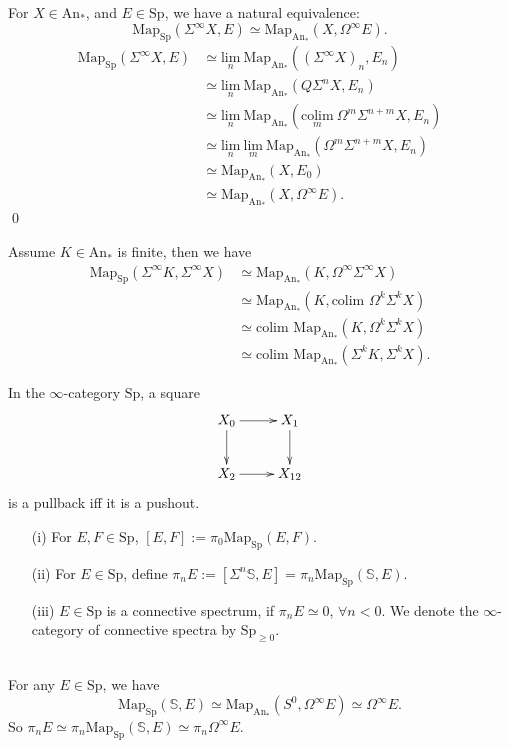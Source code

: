 \documentclass[UTF8,12,a4paper]{ctexart}
\theoremstyle{definition}
\newcommand{\An}{\text{An}}
\newcommand{\Sp}{\text{Sp}}
\begin{document}
~\\
\prop
For $X\in \An_*$, and $E\in \Sp$, we have a natural equivalence:
$$
\text{Map}_\Sp(\Sigma^\infty X, E)\simeq 
\text{Map}_{\An_*}(X,\Omega^\infty E). 
$$
\pf 
\begin{align*}
\text{Map}_\Sp(\Sigma^\infty X, E)
&\simeq  \underset{n}{\text{lim}}\ 
\text{Map}_{\An_*}((\Sigma^\infty X)_n,E_n)\\
&\simeq  \underset{n}{\text{lim}}\ 
\text{Map}_{\An_*}(Q\Sigma^n X,E_n)\\
&\simeq  \underset{n}{\text{lim}}\ 
\text{Map}_{\An_*}(\underset{m}{\text{colim}}\ \Omega^m\Sigma^{n+m} X,E_n)\\
&\simeq  \underset{n}{\text{lim}}\ \underset{m}{\text{lim}}\ 
\text{Map}_{\An_*}(\Omega^m\Sigma^{n+m} X,E_n)\\
&\simeq \text{Map}_{\An_*}(X, E_0)\\
&\simeq \text{Map}_{\An_*}(X,\Omega^\infty E). 
\end{align*}
\qed

\exm 
Assume $K\in\text{An}_*$ is finite, then we have
\begin{align*}
\text{Map}_\Sp(\Sigma^\infty K, \Sigma^\infty X)
&\simeq \text{Map}_{\An_*}( K, \Omega^\infty\Sigma^\infty X)\\
&\simeq \text{Map}_{\An_*}( K,\text{colim } \Omega^k\Sigma^k X)\\
&\simeq \text{colim } \text{Map}_{\An_*}( K,\Omega^k\Sigma^k X)\\
&\simeq \text{colim } \text{Map}_{\An_*}(\Sigma^k K,\Sigma^k X).
\end{align*}





\prop [Stability]
In the $\infty$-category $\Sp$, a square
\begin{equation*}
\xymatrix{
	X_0\ar[r] \ar[d]&X_1\ar[d]\\
	X_2 \ar[r]& X_{12}
}
\end{equation*}
 is a pullback iff it is a pushout.


\dfn
\begin{itemize}
	\item [(i)] For $E, F\in\Sp$, $[E,F]:=\pi_0\text{Map}_\Sp(E,F).$
	\item [(ii)] For $E\in \Sp$, define $\pi_n E:=[\Sigma^n\mathbb{S}, E]=\pi_n\text{Map}_\Sp(\mathbb{S},E).$
	\item [(iii)] $E\in \Sp$ is a connective spectrum, if $\pi_n E\simeq 0$, $\forall n<0.$ We denote the $\infty$-category of connective spectra by $\Sp_{\geq 0}.$
\end{itemize} 
~\\
For any $E\in\Sp$, we have
$$\text{Map}_\Sp(\mathbb{S},E)\simeq \text{Map}_{\An_*}(S^0,\Omega^\infty E)\simeq \Omega^\infty E.$$
So $\pi_n E\simeq \pi_n \text{Map}_\Sp(\mathbb{S},E)\simeq 
\pi_n \Omega^\infty E. $
\end{document}
